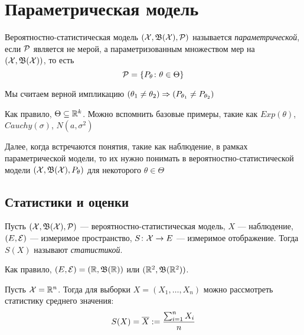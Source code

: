 \section{Параметрическая модель}

\begin{definition}
	Вероятностно-статистическая модель $(\mathcal{X}, \mathfrak{B}(\mathcal{X}), \mathcal{P})$ называется \textit{параметрической}, если $\mathcal{P}$ является не мерой, а параметризованным множеством мер на \\ $(\mathcal{X}, \mathfrak{B}(\mathcal{X}))$, то есть
	\[
		\mathcal{P} = \{P_\theta \colon \theta \in \Theta\}
	\]
\end{definition}

\begin{note}
	Мы считаем верной импликацию $(\theta_1 \neq \theta_2) \Rightarrow (P_{\theta_1} \neq P_{\theta_2})$
\end{note}

\begin{note}
	Как правило, $\Theta \subseteq \mathbb{R}^k$. Можно вспомнить базовые примеры, такие как $Exp(\theta)$, $Cauchy(\sigma)$, $N(a, \sigma^2)$
\end{note}

\begin{anote}
	Далее, когда встречаются понятия, такие как наблюдение, в рамках параметрической модели, то их нужно понимать в вероятностно-статистической модели $(\mathcal{X}, \mathfrak{B}(\mathcal{X}), P_\theta)$ для некоторого $\theta \in \Theta$
\end{anote}

\subsection{Статистики и оценки}

\begin{definition}
	Пусть $(\mathcal{X}, \mathfrak{B}(\mathcal{X}), \mathcal{P})$ --- вероятностно-статистическая модель, $X$ --- наблюдение, $(E, \mathcal{E})$ --- измеримое пространство, $S \colon \mathcal{X} \to E$ --- измеримое отображение. Тогда $S(X)$ называют \textit{статистикой}.
\end{definition}

\begin{note}
	Как правило, $(E, \mathcal{E}) = (\mathbb{R}, \mathfrak{B}(\mathbb{R}))$ или $(\mathbb{R}^2, \mathfrak{B}(\mathbb{R}^2))$.
\end{note}

\begin{example}
	Пусть $\mathcal{X} = \mathbb{R}^n$. Тогда для выборки $X = (X_1, \ldots, X_n)$ можно рассмотреть статистику среднего значения:
	\[
		S(X) = \overline{X} := \frac{\sum_{i = 1}^n X_i}{n}
	\]
\end{example}\

